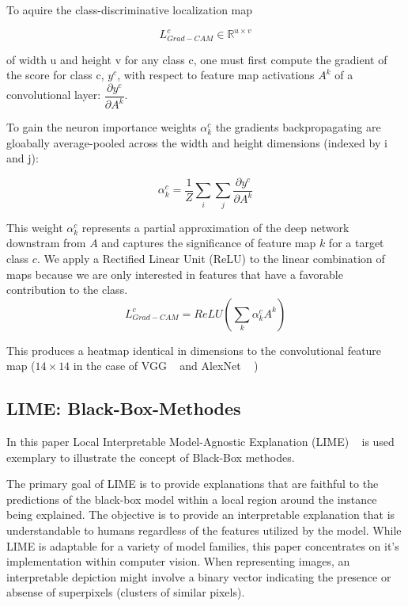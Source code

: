 \documentclass{article}
\begin{document}
To aquire the class-discriminative localization map 

\begin{equation}
    L_{Grad-CAM}^{c} \in \mathds{R}^{ u \times v}
\end{equation}

of width u and height v for any class c, one must first compute the gradient of the score for class c, \(y^c\), with respect to feature map activations \(A^k\) of a convolutional layer: \( \dfrac{ \partial y^c}{ \partial A^k} \). 

To gain the neuron importance weights \(\alpha^c_k\) the gradients backpropagating are gloabally average-pooled across the width and height dimensions (indexed by i and j): 

\begin{equation}
    \alpha^c_k = \dfrac{1}{Z}\sum_{i} \sum_{j} \dfrac{\partial y^c}{\partial A^k}
\end{equation}


This weight $\alpha^c_k$ represents a partial approximation of the deep network downstram from $A$ and captures the significance of feature map $k$ for a target class $c$. We apply a Rectified Linear Unit (ReLU) to the linear combination of maps because we are only interested in features that have a favorable contribution to the class. 
\begin{equation}
    L_{Grad-CAM}^{c} = ReLU ( \sum_{k} \alpha^c_k A^k )
\end{equation}


This produces a heatmap identical in dimensions to the convolutional feature map ($14 \times 14$ in the case of VGG ~\cite{simonyan2015deep} and AlexNet ~\cite{krizhevsky2012} )




\subsection{LIME: Black-Box-Methodes}
In this paper Local Interpretable Model-Agnostic Explanation (LIME) ~\cite{ribeiro2016why} is used exemplary to illustrate the concept of Black-Box methodes.

The primary goal of LIME is to provide explanations that are faithful to the predictions of the black-box model within a local region around the instance being explained. The objective is to provide an interpretable explanation that is understandable to humans regardless of the features utilized by the model. 
While LIME is adaptable for a variety of model families, this paper concentrates on it's implementation within computer vision. 
When representing images, an interpretable depiction might involve a binary vector indicating the presence or absense of superpixels (clusters of similar pixels).
\end{document}
